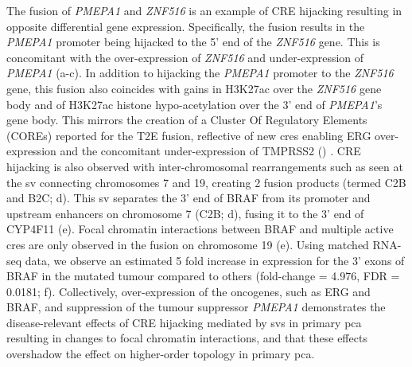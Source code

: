 The fusion of \emph{PMEPA1} and \emph{ZNF516} is an example of CRE hijacking resulting in opposite differential gene expression.
Specifically, the fusion results in the \emph{PMEPA1} promoter being hijacked to the 5' end of the \emph{ZNF516} gene.
This is concomitant with the over-expression of \emph{ZNF516} and under-expression of \emph{PMEPA1} (a-c).
In addition to hijacking the \emph{PMEPA1} promoter to the \emph{ZNF516} gene, this fusion also coincides with gains in H3K27ac over the \emph{ZNF516} gene body and of H3K27ac histone hypo-acetylation over the 3' end of \emph{PMEPA1}'s gene body.
This mirrors the creation of a Cluster Of Regulatory Elements (COREs) reported for the T2E fusion, reflective of new \glspl{cre} enabling ERG over-expression and the concomitant under-expression of TMPRSS2 () \cite{kronTMPRSS2ERGFusion2017,tomlinsRecurrentFusionTMPRSS22005,tomlinsDistinctClassesChromosomal2007}.
CRE hijacking is also observed with inter-chromosomal rearrangements such as seen at the \gls{sv} connecting chromosomes 7 and 19, creating 2 fusion products (termed C2B and B2C; d).
This \gls{sv} separates the 3' end of BRAF from its promoter and upstream enhancers on chromosome 7 (C2B; d), fusing it to the 3' end of CYP4F11 (e).
Focal chromatin interactions between BRAF and multiple active \glspl{cre} are only observed in the fusion on chromosome 19 (e).
Using matched RNA-seq data, we observe an estimated 5 fold increase in expression for the 3' exons of BRAF in the mutated tumour compared to others (fold-change = 4.976, FDR = 0.0181; f).
Collectively, over-expression of the oncogenes, such as ERG and BRAF, and suppression of the tumour suppressor \emph{PMEPA1} demonstrates the disease-relevant effects of CRE hijacking mediated by \glspl{sv} in primary \gls{pca} resulting in changes to focal chromatin interactions, and that these effects overshadow the effect on higher-order topology in primary \gls{pca}.

